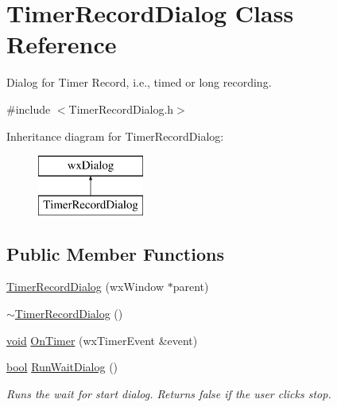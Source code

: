 \hypertarget{class_timer_record_dialog}{}\section{Timer\+Record\+Dialog Class Reference}
\label{class_timer_record_dialog}


Dialog for Timer Record, i.\+e., timed or long recording.  




{\ttfamily \#include $<$Timer\+Record\+Dialog.\+h$>$}

Inheritance diagram for Timer\+Record\+Dialog\+:\begin{figure}[H]
\begin{center}
\leavevmode
\includegraphics[height=2.000000cm]{class_timer_record_dialog}
\end{center}
\end{figure}
\subsection*{Public Member Functions}
\begin{DoxyCompactItemize}
\item 
\hyperlink{class_timer_record_dialog_a3b1249c93b19d39ae9635629c0ee7626}{Timer\+Record\+Dialog} (wx\+Window $\ast$parent)
\item 
\hyperlink{class_timer_record_dialog_a401285893c1c72a9a1b6581c59b2b37d}{$\sim$\+Timer\+Record\+Dialog} ()
\item 
\hyperlink{sound_8c_ae35f5844602719cf66324f4de2a658b3}{void} \hyperlink{class_timer_record_dialog_ac9cb2ead6debec3dead6413db7dc4235}{On\+Timer} (wx\+Timer\+Event \&event)
\item 
\hyperlink{mac_2config_2i386_2lib-src_2libsoxr_2soxr-config_8h_abb452686968e48b67397da5f97445f5b}{bool} \hyperlink{class_timer_record_dialog_ae21a123946e7e940ad9a46d10630a997}{Run\+Wait\+Dialog} ()
\begin{DoxyCompactList}\small\item\em Runs the wait for start dialog. Returns false if the user clicks stop. \end{DoxyCompactList}\end{DoxyCompactItemize}


